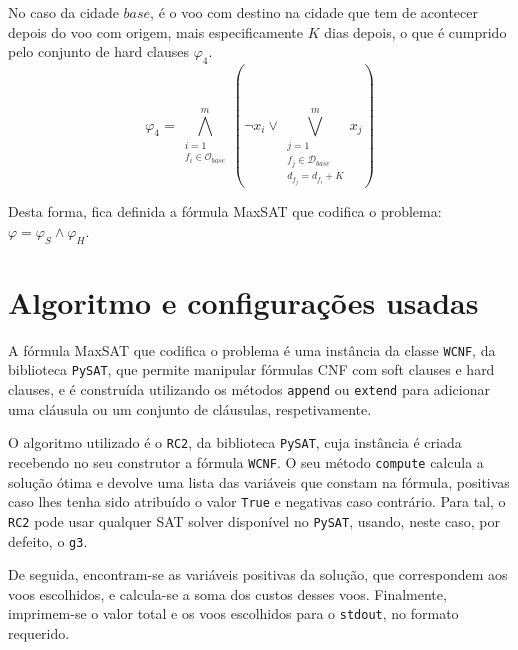 \documentclass[12pt,a4paper]{article}
\begin{document}
        No caso da cidade $base$, é o voo com destino na cidade que tem de acontecer depois do voo com origem, mais especificamente $K$ dias depois, o que é cumprido pelo conjunto de hard clauses $\varphi_4$.
        \begin{equation}
            \varphi_4 =
            \bigwedge_{\substack{i = 1 \\
                                 f_i \in \mathcal{O}_{base}}}
                     ^{m}
            \left(
            \neg x_i \lor
            \bigvee_{\substack{j = 1 \\
                               f_j \in \mathcal{D}_{base} \\
                               d_{f_j} = d_{f_i} + K}}
                ^{m}
                {x_j}
            \right)
            \label{K_nights_base}
        \end{equation}
        
        \vspace{\baselineskip}
        \vspace{\baselineskip}
        \vspace{\baselineskip}
        \noindent Desta forma, fica definida a fórmula MaxSAT que codifica o problema: $\varphi = \varphi_S \land \varphi_H$.
            
    \section{Algoritmo e configurações usadas}
        A fórmula MaxSAT que codifica o problema é uma instância da classe \texttt{WCNF}, da biblioteca \texttt{PySAT}, que permite manipular fórmulas CNF com soft clauses e hard clauses, e é construída utilizando os métodos \texttt{append} ou \texttt{extend} para adicionar uma cláusula ou um conjunto de cláusulas, respetivamente.
        
        O algoritmo utilizado é o \texttt{RC2}, da biblioteca \texttt{PySAT}, cuja instância é criada recebendo no seu construtor a fórmula \texttt{WCNF}. O seu método \texttt{compute} calcula a solução ótima e devolve uma lista das variáveis que constam na fórmula, positivas caso lhes tenha sido atribuído o valor \texttt{True} e negativas caso contrário. Para tal, o \texttt{RC2} pode usar qualquer SAT solver disponível no \texttt{PySAT}, usando, neste caso, por defeito, o \texttt{g3}.
        
        De seguida, encontram-se as variáveis positivas da solução, que correspondem aos voos escolhidos, e calcula-se a soma dos custos desses voos. Finalmente, imprimem-se o valor total e os voos escolhidos para o \texttt{stdout}, no formato requerido.
\end{document}
